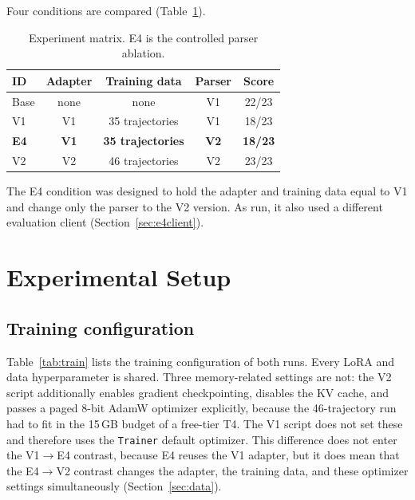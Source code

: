 \documentclass[10pt,twocolumn]{article}
\begin{document}
Four conditions are compared (Table~\ref{tab:matrix}).

\begin{table}[t]
\centering
\caption{Experiment matrix. E4 is the controlled parser ablation.}
\label{tab:matrix}
\small
\begin{tabular}{lcccc}
\toprule
ID & Adapter & Training data & Parser & Score \\
\midrule
Base & none     & none             & V1 & 22/23 \\
V1   & V1       & 35 trajectories  & V1 & 18/23 \\
\textbf{E4} & \textbf{V1} & \textbf{35 trajectories} & \textbf{V2} & \textbf{18/23} \\
V2   & V2       & 46 trajectories  & V2 & 23/23 \\
\bottomrule
\end{tabular}
\end{table}

The E4 condition was designed to hold the adapter and training data equal to V1 and change only the parser to the V2 version. As run, it also used a different evaluation client (Section~\ref{sec:e4client}).

\section{Experimental Setup}
\label{sec:setup}

\subsection{Training configuration}

Table~\ref{tab:train} lists the training configuration of both runs. Every LoRA
and data hyperparameter is shared. Three memory-related settings are not: the V2
script additionally enables gradient checkpointing, disables the KV cache, and
passes a paged 8-bit AdamW optimizer explicitly, because the 46-trajectory run
had to fit in the 15\,GB budget of a free-tier T4. The V1 script does not set
these and therefore uses the \texttt{Trainer} default optimizer. This difference does not enter the V1$\to$E4 contrast, because E4 reuses the V1
adapter, but it does mean that the E4$\to$V2 contrast changes the adapter, the
training data, and these optimizer settings simultaneously
(Section~\ref{sec:data}).
\end{document}
